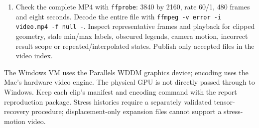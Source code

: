 \begin{enumerate}
\item Check the complete MP4 with \texttt{ffprobe}: 3840 by 2160, rate 60/1, 480 frames and eight seconds. Decode the entire file with \texttt{ffmpeg -v error -i video.mp4 -f null -}. Inspect representative frames and playback for clipped geometry, stale min/max labels, obscured legends, camera motion, incorrect result scope or repeated/interpolated states. Publish only accepted files in the video index.
\end{enumerate}
The Windows VM uses the Parallels WDDM graphics device; encoding uses the Mac's hardware video engine. The physical GPU is not directly passed through to Windows. Keep each clip's manifest and encoding command with the report reproduction package. Stress histories require a separately validated tensor-recovery procedure; displacement-only expansion files cannot support a stress-motion video.

